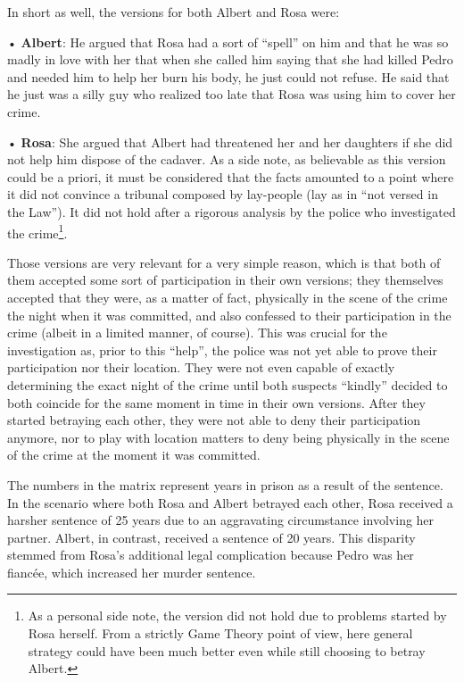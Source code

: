 \documentclass[11pt, a4paper]{article}
\begin{document}
In short as well, the versions for both Albert and Rosa were:

    • \textbf{Albert}: He argued that Rosa had a sort of “spell” on him and that he was so madly in love with her that when she called him saying that she had killed Pedro and needed him to help her burn his body, he just could not refuse. He said that he just was a silly guy who realized too late that Rosa was using him to cover her crime.

    • \textbf{Rosa}: She argued that Albert had threatened her and her daughters if she did not help him dispose of the cadaver. As a side note, as believable as this version could be a priori, it must be considered that the facts amounted to a point where it did not convince a tribunal composed by lay-people (lay as in “not versed in the Law”). It did not hold after a rigorous analysis by the police who investigated the crime\footnote{As a personal side note, the version did not hold due to problems started by Rosa herself. From a strictly Game Theory point of view, here general strategy could have been much better even while still choosing to betray Albert.}. 
    
Those versions are very relevant for a very simple reason, which is that both of them accepted some sort of participation in their own versions; they themselves accepted that they were, as a matter of fact, physically in the scene of the crime the night when it was committed, and also confessed to their participation in the crime (albeit in a limited manner, of course). This was crucial for the investigation as, prior to this “help”, the police was not yet able to prove their participation nor their location. They were not even capable of exactly determining the exact night of the crime until both suspects “kindly” decided to both coincide for the same moment in time in their own versions. After they started betraying each other, they were not able to deny their participation anymore, nor to play with location matters to deny being physically in the scene of the crime at the moment it was committed.

The numbers in the matrix represent years in prison as a result of the sentence. In the scenario where both Rosa and Albert betrayed each other, Rosa received a harsher sentence of 25 years due to an aggravating circumstance involving her partner. Albert, in contrast, received a sentence of 20 years. This disparity stemmed from Rosa's additional legal complication because Pedro was her fiancée, which increased her murder sentence.
\end{document}
